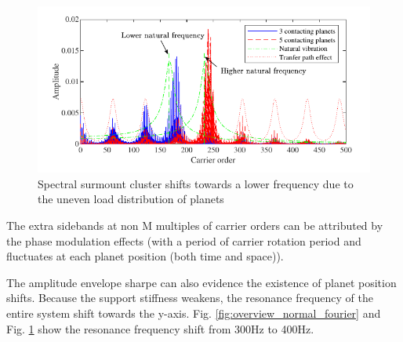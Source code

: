 \documentclass[a4paper,fleqn]{cas-sc}%
\begin{document}
\begin{figure}[pos=htbp]
    \centering
    \includegraphics[scale=1]{Shifted_natural_frequency}
    \caption{Spectral surmount cluster shifts towards a lower frequency due to the uneven load distribution of planets}\label{fig:Shifted_natural_frequency}
\end{figure}
\par The extra sidebands at non M multiples of carrier orders can be attributed by the phase modulation effects (with a period of carrier rotation period and fluctuates at each planet position (both time and space)).
\par The amplitude envelope sharpe can also evidence the existence of planet position shifts. Because the support stiffness weakens, the resonance frequency of the entire system shift towards the y-axis. Fig. \ref{fig:overview_normal_fourier} and Fig. \ref{fig:Shifted_natural_frequency} show the resonance frequency shift from 300Hz to 400Hz.
\end{document}
